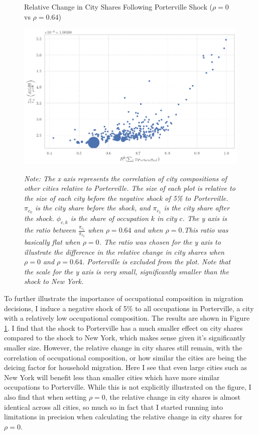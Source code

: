 \documentclass[10pt]{article}
\begin{document}
\begin{figure}[!htb]
    \centering
    \caption{Relative Change in City Shares Following Porterville Shock ($\rho = 0$ vs $\rho = 0.64$)}
    \includegraphics[width=\textwidth]{../../estimations/graphs/city_shock_s.png}
    \label{vp_change_graph}
    \caption*{\small\textit{Note: The x axis represents the correlation of city compositions of other cities relative to Porterville. The size of each plot is relative to the size of each city before the negative shock of 5\% to Porterville. $\pi_{c_0}$ is the city share before the shock, and $\pi_{c_1}$ is the city share after the shock. $\phi_{c, k}$ is the share of occupation $k$ in city $c$. The y axis is the ratio between $\frac{\pi_{c_1}}{\pi_{c_0}}$ when $\rho = 0.64$ and when $\rho = 0$.This ratio was basically flat when $\rho = 0$. The ratio was chosen for the y axis to illustrate the difference in the relative change in city shares when $\rho = 0$ and $\rho = 0.64$. Porterville is excluded from the plot. Note that the scale for the y axis is very small, significantly smaller than the shock to New York.}}
\end{figure}

To further illustrate the importance of occupational composition in migration decisions, I induce a negative shock of 5\% to all occupations in Porterville, a city with a relatively low occupational composition. The results are shown in Figure \ref{vp_change_graph}. I find that the shock to Porterville has a much smaller effect on city shares compared to the shock to New York, which makes sense given it's significantly smaller size. However, the relative change in city shares still remain, with the correlation of occupational composition, or how similar the cities are being the deicing factor for household migration. Here I see that even large cities such as New York will benefit less than smaller cities which have more similar occupations to Porterville. While this is not explicitly illustrated on the figure, I also find that when setting $\rho = 0$, the relative change in city shares is almost identical across all cities, so much so in fact that I started running into limitations in precision when calculating the relative change in city shares for $\rho = 0$.
\end{document}
